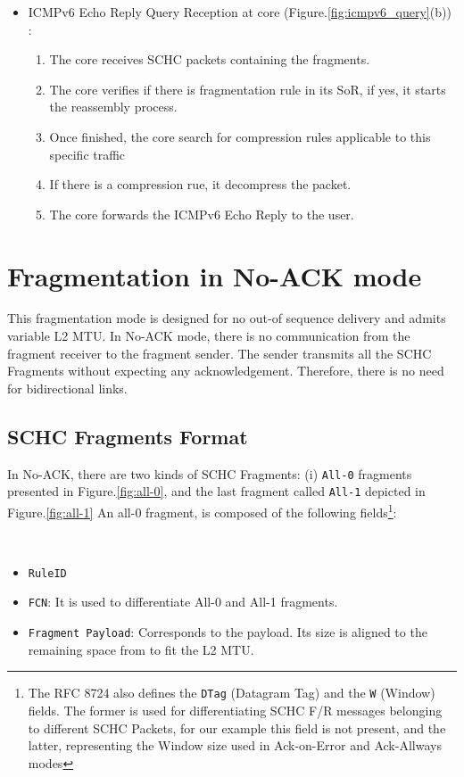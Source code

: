 \begin{itemize}
\item ICMPv6 Echo Reply Query Reception at core (Figure.\ref{fig:icmpv6_query}(b)) : 
\begin{enumerate}
    \item The core receives SCHC packets containing the fragments.
    \item The core verifies if there is fragmentation rule in its SoR, if yes, it starts the reassembly process.
    \item Once finished, the core search for compression rules applicable to this specific traffic 
    \item If there is a compression rue, it decompress the packet.
    \item The core forwards the ICMPv6 Echo Reply to the user.
\end{enumerate}
\end{itemize}

\section{Fragmentation in No-ACK mode}

This fragmentation mode is designed for no out-of sequence delivery and admits variable L2 MTU.
In No-ACK mode, there is no communication from the fragment receiver to the fragment sender.  
The sender transmits all the SCHC Fragments without expecting any acknowledgement.  
Therefore, there is no need for bidirectional links.

\subsection{SCHC Fragments Format}

In No-ACK, there are two kinds of SCHC Fragments: (i) \texttt{All-0} fragments presented in Figure.\ref{fig:all-0}, and the last fragment called \texttt{All-1} depicted in Figure.\ref{fig:all-1}
An all-0 fragment, is composed of the following fields\footnote{The RFC 8724 also defines the \texttt{DTag} (Datagram Tag) and the \texttt{W} (Window) fields. The former is used for differentiating SCHC F/R messages belonging to different SCHC Packets, for our example this field is not present, and the latter, representing the Window size used in Ack-on-Error and Ack-Allways modes}:

~

\begin{itemize}
    \item \texttt{RuleID}
    \item \texttt{FCN}: It is used to differentiate All-0 and All-1 fragments. 
    \item \texttt{Fragment Payload}: Corresponds to the payload. Its size is aligned to the remaining space from to fit the L2 MTU.
\end{itemize}

